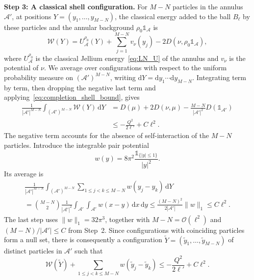 \documentclass[final,reqno]{amsart}
\theoremstyle{remark}
\theoremstyle{definition}
\renewcommand{\le}{\leqslant}
\newcommand{\iden}{\mathbb{1}}
\begin{document}
\medskip

\noindent\textbf{Step 3: A classical shell configuration.}
For $M-N$ particles in the annulus $\mathcal A'$, at positions $Y=(y_1,\dots,y_{M-N})$, the classical energy added to the ball $B_\ell$ by these particles and the annular background $\rho_0\iden_{\mathcal A}$ is
\[
\mathcal W(Y)=U^{\rho_0}_{\mathcal A}(Y)
+\sum_{j=1}^{M-N}v_\nu(y_j)-2D(\nu,\rho_0\iden_{\mathcal A}),
\]
where $U^{\rho_0}_{\mathcal A}$ is the classical Jellium energy~\eqref{eq:LN_U} of the annulus and $v_\nu$ is the potential of $\nu$. We average over configurations with respect to the uniform probability measure on $(\mathcal A')^{M-N}$, writing $\mathrm dY=\mathrm dy_1\cdots\mathrm dy_{M-N}$. Integrating term by term, then dropping the negative last term and applying~\eqref{eq:completion_shell_bound}, gives
\begin{equation}\label{eq:completion_sampling}
\begin{split}
\frac1{|\mathcal A'|^{M-N}}\int_{(\mathcal A')^{M-N}}\mathcal W(Y)\,\mathrm dY
&=D(\mu)+2D(\nu,\mu)-\frac{M-N}{|\mathcal A'|^2}D(\iden_{\mathcal A'})\\
&\le-\frac{Q^2}{2\ell'}+C\ell^2.
\end{split}
\end{equation}
The negative term accounts for the absence of self-interaction of the $M-N$ particles. Introduce the integrable pair potential
\[
w(y)=8\pi^2\frac{\iden_{\{|y|\le1\}}}{|y|^2}.
\]
Its average is
\begin{multline*}
\frac1{|\mathcal A'|^{M-N}}\int_{(\mathcal A')^{M-N}}\sum_{1\le j<k\le M-N}w(y_j-y_k)\,\mathrm dY\\
=\binom{M-N}2\frac1{|\mathcal A'|^2}\int_{\mathcal A'}\int_{\mathcal A'}w(x-y)\,\mathrm dx\,\mathrm dy
\le\frac{(M-N)^2}{2|\mathcal A'|}\|w\|_1\le C\ell^2.
\end{multline*}
The last step uses $\|w\|_1=32\pi^3$, together with $M-N=\mathcal O(\ell^2)$ and $(M-N)/|\mathcal A'|\le C$ from Step~2. Since configurations with coinciding particles form a null set, there is consequently a configuration $\widetilde Y=(\tilde y_1,\dots,\tilde y_{M-N})$ of distinct particles in $\mathcal A'$ such that
\begin{equation}\label{eq:completion_penalized_configuration}
\mathcal W(\widetilde Y)+\sum_{1\le j<k\le M-N}w(\tilde y_j-\tilde y_k)
\le-\frac{Q^2}{2\ell'}+C\ell^2.
\end{equation}

\medskip
\end{document}
